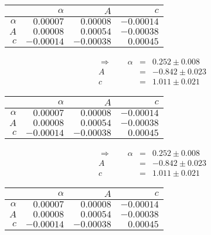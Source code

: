  \begin{tabular}{|r|r|r|r|}
 \hline 
\cellcolor{tabcolor}&\cellcolor{tabcolor}$\alpha$&\cellcolor{tabcolor}$A$&\cellcolor{tabcolor}$c$\\ \hline 
 \cellcolor{tabcolor}$\alpha$&$0.00007$ &$0.00008$ &$-0.00014$ \\ \hline
\cellcolor{tabcolor}$A$&$0.00008$ &$0.00054$ &$-0.00038$ \\ \hline
\cellcolor{tabcolor}$c$&$-0.00014$ &$-0.00038$ &$0.00045$ \\ \hline
\end{tabular}
\begin{align}\Rightarrow \qquad
    \alpha &=& 0.252 \pm 0.008 \\
    A &=& -0.842 \pm 0.023 \\
    c &=& 1.011 \pm 0.021 
\end{align}

 \begin{tabular}{|r|r|r|r|}
 \hline 
\cellcolor{tabcolor}&\cellcolor{tabcolor}$\alpha$&\cellcolor{tabcolor}$A$&\cellcolor{tabcolor}$c$\\ \hline 
 \cellcolor{tabcolor}$\alpha$&$0.00007$ &$0.00008$ &$-0.00014$ \\ \hline
\cellcolor{tabcolor}$A$&$0.00008$ &$0.00054$ &$-0.00038$ \\ \hline
\cellcolor{tabcolor}$c$&$-0.00014$ &$-0.00038$ &$0.00045$ \\ \hline
\end{tabular}
\begin{align}\Rightarrow \qquad
    \alpha &=& 0.252 \pm 0.008 \\
    A &=& -0.842 \pm 0.023 \\
    c &=& 1.011 \pm 0.021 
\end{align}

 \begin{tabular}{|r|r|r|r|}
 \hline 
\cellcolor{tabcolor}&\cellcolor{tabcolor}$\alpha$&\cellcolor{tabcolor}$A$&\cellcolor{tabcolor}$c$\\ \hline 
 \cellcolor{tabcolor}$\alpha$&$0.00007$ &$0.00008$ &$-0.00014$ \\ \hline
\cellcolor{tabcolor}$A$&$0.00008$ &$0.00054$ &$-0.00038$ \\ \hline
\cellcolor{tabcolor}$c$&$-0.00014$ &$-0.00038$ &$0.00045$ \\ \hline
\end{tabular}
